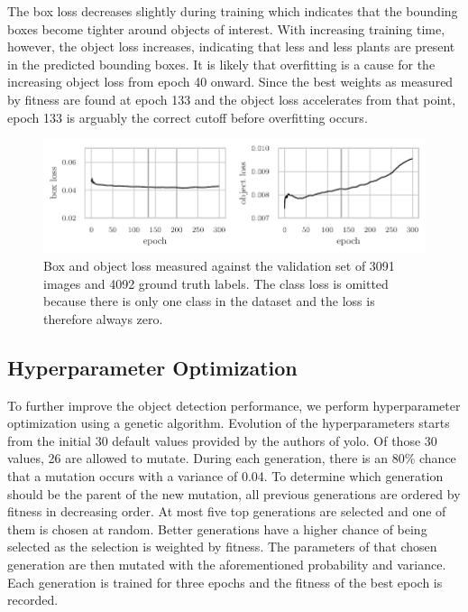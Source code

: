 \documentclass[final]{vutinfth} %
\begin{document}
The box loss decreases slightly during training which indicates that
the bounding boxes become tighter around objects of interest. With
increasing training time, however, the object loss increases,
indicating that less and less plants are present in the predicted
bounding boxes. It is likely that overfitting is a cause for the
increasing object loss from epoch \num{40} onward. Since the best
weights as measured by fitness are found at epoch \num{133} and the
object loss accelerates from that point, epoch \num{133} is arguably
the correct cutoff before overfitting occurs.

\begin{figure}
  \centering
  \includegraphics{graphics/val_box_obj_loss.pdf}
  \caption[Object detection box and object loss.]{Box and object loss
    measured against the validation set of \num{3091} images and
    \num{4092} ground truth labels. The class loss is omitted because
    there is only one class in the dataset and the loss is therefore
    always zero.}
  \label{fig:box-obj-loss}
\end{figure}

\subsection{Hyperparameter Optimization}
\label{ssec:obj-hypopt}

To further improve the object detection performance, we perform
hyperparameter optimization using a genetic algorithm. Evolution of
the hyperparameters starts from the initial \num{30} default values
provided by the authors of \gls{yolo}. Of those \num{30} values,
\num{26} are allowed to mutate. During each generation, there is an
80\% chance that a mutation occurs with a variance of \num{0.04}. To
determine which generation should be the parent of the new mutation,
all previous generations are ordered by fitness in decreasing
order. At most five top generations are selected and one of them is
chosen at random. Better generations have a higher chance of being
selected as the selection is weighted by fitness. The parameters of
that chosen generation are then mutated with the aforementioned
probability and variance. Each generation is trained for three epochs
and the fitness of the best epoch is recorded.
\end{document}
